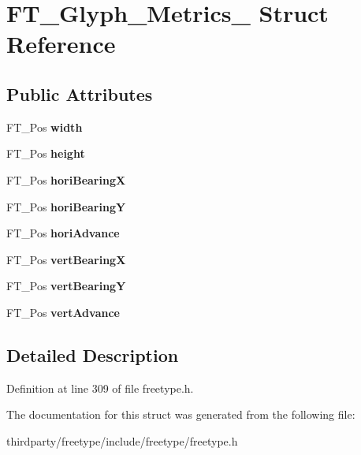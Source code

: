\hypertarget{struct_f_t___glyph___metrics__}{}\section{F\+T\+\_\+\+Glyph\+\_\+\+Metrics\+\_\+ Struct Reference}
\label{struct_f_t___glyph___metrics__}
\subsection*{Public Attributes}
\begin{DoxyCompactItemize}
\item 
\mbox{\label{struct_f_t___glyph___metrics___a0ff1be869e6a28d1f2990b0e5719dca9}} 
F\+T\+\_\+\+Pos {\bfseries width}
\item 
\mbox{\label{struct_f_t___glyph___metrics___aa2a76ec448ec9d18acf343f01b77cb21}} 
F\+T\+\_\+\+Pos {\bfseries height}
\item 
\mbox{\label{struct_f_t___glyph___metrics___a2afc877f52c8a8910ec144a1948186cc}} 
F\+T\+\_\+\+Pos {\bfseries hori\+BearingX}
\item 
\mbox{\label{struct_f_t___glyph___metrics___afd97c10d43ed1f66598a18884468b536}} 
F\+T\+\_\+\+Pos {\bfseries hori\+BearingY}
\item 
\mbox{\label{struct_f_t___glyph___metrics___af12db260a90b8a7c938ad48ebf20ccbe}} 
F\+T\+\_\+\+Pos {\bfseries hori\+Advance}
\item 
\mbox{\label{struct_f_t___glyph___metrics___aead5c5637b983b811738bff3bcea8cea}} 
F\+T\+\_\+\+Pos {\bfseries vert\+BearingX}
\item 
\mbox{\label{struct_f_t___glyph___metrics___a7f1aba91b86fddeb11030eab15dcce08}} 
F\+T\+\_\+\+Pos {\bfseries vert\+BearingY}
\item 
\mbox{\label{struct_f_t___glyph___metrics___a594f43c64fe5c12a399a0f0a47c04990}} 
F\+T\+\_\+\+Pos {\bfseries vert\+Advance}
\end{DoxyCompactItemize}


\subsection{Detailed Description}


Definition at line 309 of file freetype.\+h.



The documentation for this struct was generated from the following file\+:\begin{DoxyCompactItemize}
\item 
thirdparty/freetype/include/freetype/freetype.\+h\end{DoxyCompactItemize}
